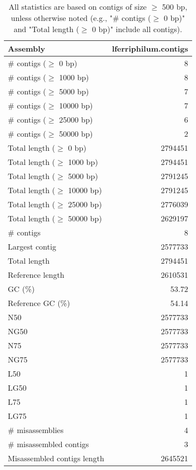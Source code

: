 \documentclass[12pt,a4paper]{article}
\begin{document}
\begin{table}[ht]
\begin{center}
\caption{All statistics are based on contigs of size $\geq$ 500 bp, unless otherwise noted (e.g., "\# contigs ($\geq$ 0 bp)" and "Total length ($\geq$ 0 bp)" include all contigs).}
\begin{tabular}{|l*{1}{|r}|}
\hline
Assembly & lferriphilum.contigs \\ \hline
\# contigs ($\geq$ 0 bp) & 8 \\ \hline
\# contigs ($\geq$ 1000 bp) & 8 \\ \hline
\# contigs ($\geq$ 5000 bp) & 7 \\ \hline
\# contigs ($\geq$ 10000 bp) & 7 \\ \hline
\# contigs ($\geq$ 25000 bp) & 6 \\ \hline
\# contigs ($\geq$ 50000 bp) & 2 \\ \hline
Total length ($\geq$ 0 bp) & 2794451 \\ \hline
Total length ($\geq$ 1000 bp) & 2794451 \\ \hline
Total length ($\geq$ 5000 bp) & 2791245 \\ \hline
Total length ($\geq$ 10000 bp) & 2791245 \\ \hline
Total length ($\geq$ 25000 bp) & 2776039 \\ \hline
Total length ($\geq$ 50000 bp) & 2629197 \\ \hline
\# contigs & 8 \\ \hline
Largest contig & 2577733 \\ \hline
Total length & 2794451 \\ \hline
Reference length & 2610531 \\ \hline
GC (\%) & 53.72 \\ \hline
Reference GC (\%) & 54.14 \\ \hline
N50 & 2577733 \\ \hline
NG50 & 2577733 \\ \hline
N75 & 2577733 \\ \hline
NG75 & 2577733 \\ \hline
L50 & 1 \\ \hline
LG50 & 1 \\ \hline
L75 & 1 \\ \hline
LG75 & 1 \\ \hline
\# misassemblies & 4 \\ \hline
\# misassembled contigs & 3 \\ \hline
Misassembled contigs length & 2645521 \\ \hline

\end{tabular}
\end{center}
\end{table}
\end{document}
